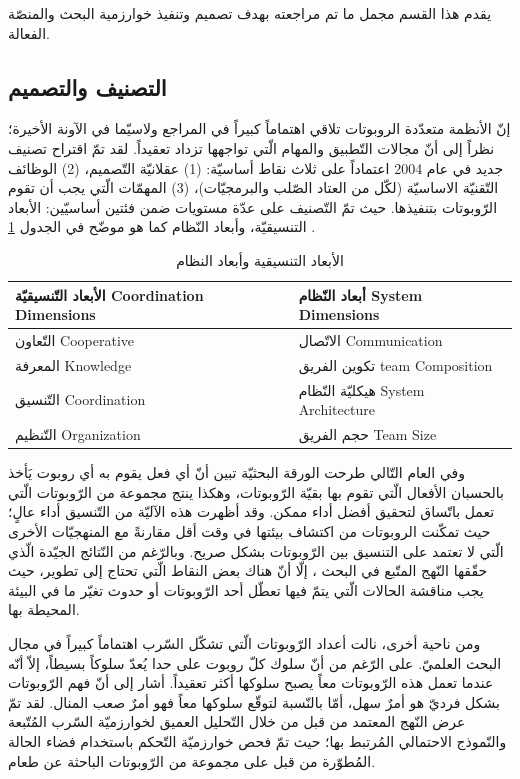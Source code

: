 يقدم هذا القسم مجمل ما تم مراجعته بهدف تصميم وتنفيذ خوارزمية البحث والمنصّة الفعالة.

\subsection{التصنيف والتصميم}

إنّ الأنظمة متعدّدة الروبوتات تلاقي اهتماماً كبيراً في المراجع ولاسيّما في الآونة الأخيرة؛ نظراً إلى أنّ مجالات التّطبيق والمهام الّتي تواجهها تزداد تعقيداً. لقد تمّ اقتراح تصنيف جديد في عام 2004 اعتماداً على ثلاث نقاط أساسيّة: (1) عقلانيّة التّصميم، (2) الوظائف التّقنيّة الاساسيّة (لكّل من العتاد الصّلب والبرمجيّات)، (3) المهمّات الّتي يجب أن تقوم الرّوبوتات بتنفيذها. حيث تمّ التّصنيف على عدّة مستويات ضمن فئتين أساسيّين: الأبعاد التنسيقيّة، وأبعاد النّظام كما هو موضّح في الجدول \ref{06:table:1} \cite{b4}. 

\begin{table}[]
	\begin{tabular}{|l|l|}
		\hline
		الأبعاد التّنسيقيّة Coordination Dimensions & أبعاد النّظام System Dimensions       \\ \hline
		التّعاون   Cooperative                      & الاتّصال   Communication              \\ \hline
		المعرفة Knowledge                           & تكوين   الفريق team Composition       \\ \hline
		التّنسيق   Coordination                     & هيكليّة   النّظام System Architecture \\ \hline
		التّنظيم Organization                       & حجم الفريق Team Size                  \\ \hline
	\end{tabular}
\caption{الأبعاد التنسيقية وأبعاد النظام}
\label{06:table:1}
\end{table}

وفي العام التّالي طرحت الورقة البحثيّة \cite{b5} تبين أنّ أي فعل يقوم به أي روبوت يَأخذ بالحسبان الأفعال الّتي تقوم بها بقيّة الرّوبوتات، وهكذا ينتج مجموعة من الرّوبوتات الّتي تعمل باتّساق لتحقيق أفضل أداء ممكن. وقد أظهرت هذه الآليّة من التّنسيق أداء عالٍ؛ حيث تمكّنت الروبوتات من اكتشاف بيئتها في وقت أقل مقارنةً مع المنهجيّات الأخرى الّتي لا تعتمد على التنسيق بين الرّوبوتات بشكل صريح. وبالرّغم من النّتائج الجيّدة الّذي حقّقها النّهج المتّبع في البحث \cite{b5}، إلّا أنّ هناك بعض النقاط الّتي تحتاج إلى تطوير، حيث يجب مناقشة الحالات الّتي يتمّ فيها تعطّل أحد الرّوبوتات أو حدوث تغيّر ما في البيئة المحيطة بها.

ومن ناحية أخرى، نالت أعداد الرّوبوتات الّتي تشكّل السّرب اهتماماً كبيراً في مجال البحث العلميّ. على الرّغم من أنّ سلوك كلّ روبوت على حدا يُعدّ سلوكاً بسيطاً، إلاّ أنّه عندما تعمل هذه الرّوبوتات معاً يصبح سلوكها أكثر تعقيداً. أشار \cite{b6} إلى أنّ فهم الرّوبوتات بشكل فرديّ هو أمرٌ سهل، أمّا بالنّسبة لتوقّع سلوكها معاً فهو أمرٌ صعب المنال. لقد تمّ عرض النّهج المعتمد من قبل \cite{b6} من خلال التّحليل العميق لخوارزميّة السّرب المُتّبعة والنّموذج الاحتمالي المُرتبط بها؛ حيث تمّ فحص خوارزميّة التّحكم باستخدام فضاء الحالة المُطوّرة من قبل \cite{b7} على مجموعة من الرّوبوتات الباحثة عن طعام.


